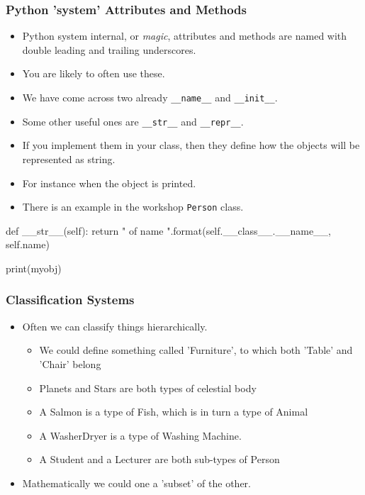 \documentclass{beamer}
\begin{document}
\begin{frame}[fragile]
\frametitle{Python 'system' Attributes and Methods}
\begin{itemize}
\item Python system internal, or \emph{magic}, attributes and methods are
named with double leading and trailing underscores.
\item You are likely to often use these.
\item We have come across two already \lstinline|__name__| and \lstinline|__init__|.
\item Some other useful ones are \lstinline|__str__| and \lstinline|__repr__|.
\item If you implement them in your class, then they define how the objects will be represented as string.
\item For instance when the object is printed.
\item There is an example in the workshop \lstinline|Person| class.
\end{itemize}
\begin{code}
  def __str__(self):
    return "{} of name {}".format(self.__class__.__name__, 
                              self.name)
		
print(myobj)
\end{code}
\end{frame}


\begin{frame}[fragile]
\frametitle{Classification Systems}
\begin{itemize}
\item Often we can classify things hierarchically.
\begin{itemize}
\item We could define something called 'Furniture', to which both 'Table' and 'Chair' belong
\item Planets and Stars are both types of celestial body
\item A Salmon is a type of Fish, which is in turn a type of Animal
\item A WasherDryer is a type of Washing Machine.
\item A Student and a Lecturer are both sub-types of Person
\end{itemize}
\item Mathematically we could one a 'subset' of the other.
\end{itemize}

\end{frame}
\end{document}

